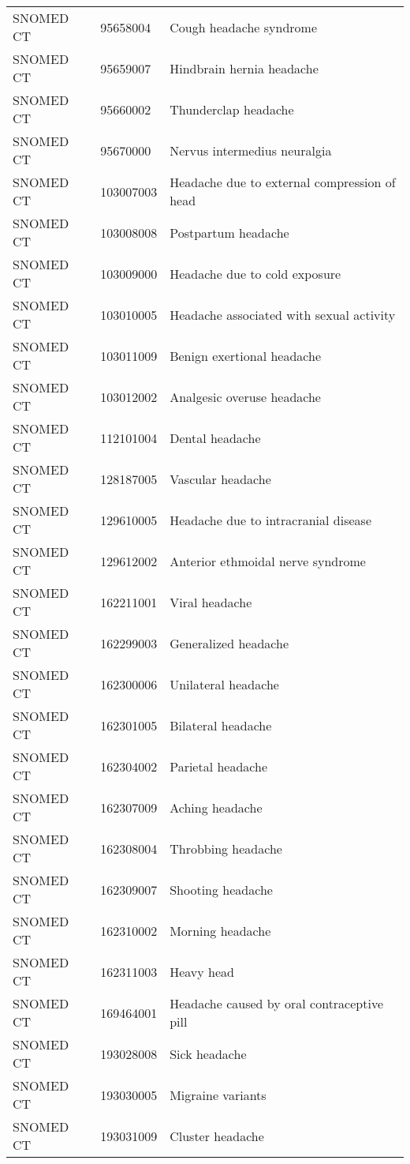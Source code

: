 \begin{longtable}{p{}p{}p{}}
  SNOMED CT & 95658004 & Cough headache syndrome \\ 
  SNOMED CT & 95659007 & Hindbrain hernia headache \\ 
  SNOMED CT & 95660002 & Thunderclap headache \\ 
  SNOMED CT & 95670000 & Nervus intermedius neuralgia \\ 
  SNOMED CT & 103007003 & Headache due to external compression of head \\ 
  SNOMED CT & 103008008 & Postpartum headache \\ 
  SNOMED CT & 103009000 & Headache due to cold exposure \\ 
  SNOMED CT & 103010005 & Headache associated with sexual activity \\ 
  SNOMED CT & 103011009 & Benign exertional headache \\ 
  SNOMED CT & 103012002 & Analgesic overuse headache \\ 
  SNOMED CT & 112101004 & Dental headache \\ 
  SNOMED CT & 128187005 & Vascular headache \\ 
  SNOMED CT & 129610005 & Headache due to intracranial disease \\ 
  SNOMED CT & 129612002 & Anterior ethmoidal nerve syndrome \\ 
  SNOMED CT & 162211001 & Viral headache \\ 
  SNOMED CT & 162299003 & Generalized headache \\ 
  SNOMED CT & 162300006 & Unilateral headache \\ 
  SNOMED CT & 162301005 & Bilateral headache \\ 
  SNOMED CT & 162304002 & Parietal headache \\ 
  SNOMED CT & 162307009 & Aching headache \\ 
  SNOMED CT & 162308004 & Throbbing headache \\ 
  SNOMED CT & 162309007 & Shooting headache \\ 
  SNOMED CT & 162310002 & Morning headache \\ 
  SNOMED CT & 162311003 & Heavy head \\ 
  SNOMED CT & 169464001 & Headache caused by oral contraceptive pill \\ 
  SNOMED CT & 193028008 & Sick headache \\ 
  SNOMED CT & 193030005 & Migraine variants \\ 
  SNOMED CT & 193031009 & Cluster headache \\ 

\end{longtable}
